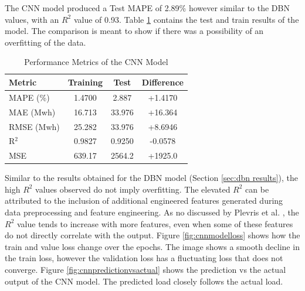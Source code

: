  The CNN model produced a Test MAPE of 2.89\% however similar to the DBN values, with an $R^2$ value of 0.93. Table \ref{tab:cnn_performance_diff} contains the test and train results of the model. The comparison is meant to show if there was a possibility of an overfitting of the data.
 \begin{table}[h!]
 	\small
 	\centering
 	\caption{Performance Metrics of the CNN Model}
 	\label{tab:cnn_performance_diff}
 	\begin{tabular}{lccc}
 		\hline
 		\textbf{Metric} & \textbf{Training} & \textbf{Test} & \textbf{Difference} \\
 		\hline
 		MAPE (\%) & 1.4700 & 2.887 & +1.4170 \\
 		MAE (Mwh) & 16.713 & 33.976& +16.364 \\
 		RMSE (Mwh) & 25.282 & 33.976 & +8.6946 \\
 		R$^2$ & 0.9827 & 0.9250 & -0.0578 \\
 		MSE & 639.17 & 2564.2 & +1925.0 \\
 		\hline
 	\end{tabular}
 \end{table}
Similar to the results obtained for the DBN model (Section \ref{sec:dbn results}), the high $R^2$ values observed do not imply overfitting. The elevated $R^2$ can be attributed to the inclusion of additional engineered features generated during data preprocessing and feature engineering. As no discussed by Plevris et al. \cite{plevris2022investigation}, the $R^2$ value tends to increase with more features, even when some of these features do not directly correlate with the  output. Figure \ref{fig:cnnmodelloss} shows how the train and value loss change over the epochs. The image shows a smooth decline in the train loss, however the validation loss has a fluctuating loss that does not converge.
Figure \ref{fig:cnnpredictionvsactual} shows the prediction vs the actual output of the CNN model. The predicted load closely follows the actual load.
